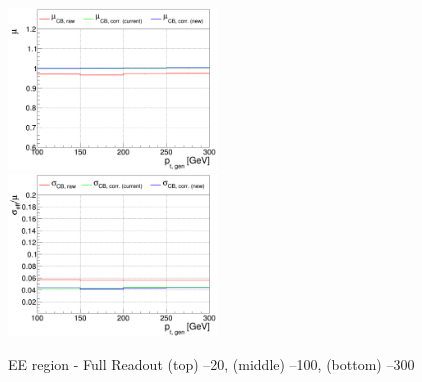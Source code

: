 \begin{figure}
\includegraphics[width=0.495\textwidth]{./plots_pdf/ECAL_plots/plotsPU/EE/FULL/pdf/GENPT/EEFULL_GENPT_0100_0300_MuOverBins.pdf}
\includegraphics[width=0.495\textwidth]{./plots_pdf/ECAL_plots/plotsPU/EE/FULL/pdf/GENPT/EEFULL_GENPT_0100_0300_EffSigmaOverBins.pdf}


\caption{EE region - Full Readout (top) --20\GeV , (middle) --100\GeV, (bottom) --300\GeV}
\label{fig:PU_EEFULL_pt}
\end{figure}


